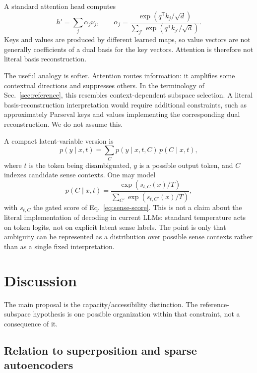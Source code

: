 \documentclass[
  aps,
  reprint,
  superscriptaddress,
  floatfix,
  nofootinbib,
  longbibliography
]{revtex4-2}
\newcommand{\T}{^{\mathsf{T}}}
\begin{document}
A standard attention head computes
%
\begin{equation}
\label{eq:attention}
h'=\sum_j\alpha_j\nu_j,
\qquad
\alpha_j=
\frac{\exp(q\T k_j/\sqrt d)}
{\sum_{j'}\exp(q\T k_{j'}/\sqrt d)} .
\end{equation}
%
Keys and values are produced by different learned maps, so value vectors
are not generally coefficients of a dual basis for the key vectors.
Attention is therefore not literal basis reconstruction.

The useful analogy is softer. Attention routes information: it amplifies
some contextual directions and suppresses others. In the terminology of
Sec.~\ref{sec:reference}, this resembles context-dependent subspace
selection. A literal basis-reconstruction interpretation would require
additional constraints, such as approximately Parseval keys and values
implementing the corresponding dual reconstruction. We do not assume this.

A compact latent-variable version is
%
\begin{equation}
\label{eq:latent}
p(y\mid x,t)=\sum_C p(y\mid x,t,C)\,p(C\mid x,t),
\end{equation}
%
where $t$ is the token being disambiguated, $y$ is a possible output token,
and $C$ indexes candidate sense contexts. One may model
%
\begin{equation}
\label{eq:context-temp}
p(C\mid x,t)=
\frac{\exp(s_{t,C}(x)/T)}
{\sum_{C'}\exp(s_{t,C'}(x)/T)} ,
\end{equation}
%
with $s_{t,C}$ the gated score of Eq.~\eqref{eq:sense-score}. This is not
a claim about the literal implementation of decoding in current LLMs:
standard temperature acts on token logits, not on explicit latent
sense labels. The point is only that ambiguity can be represented as a
distribution over possible sense contexts rather than as a single fixed
interpretation.

\section{Discussion}
\label{sec:discussion}

The main proposal is the capacity/accessibility distinction. The
reference-subspace hypothesis is one possible organization within that
constraint, not a consequence of it.

\subsection{Relation to superposition and sparse autoencoders}
\label{sec:superposition}
\end{document}
